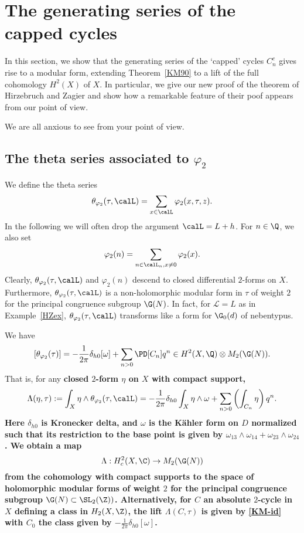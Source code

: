 \section{The generating series of the capped cycles}

In this section, we show that the generating series of the `capped'
cycles $C_n^c$ gives rise to a modular form, extending Theorem~\ref{KM90}
to a lift of the full cohomology $H^2(X)$ of $X$. In particular,
we give our new proof of the theorem of Hirzebruch and Zagier and
show how a remarkable feature of their poof appears from our point
of view.

We are all anxious to see from your point of view.


\subsection{The theta series associated to $\varphi_2$}

We define the theta series
\[
\theta_{\varphi_2}(\tau,\calL) = \sum_{x \in \calL} \varphi_2(x,\tau,z).
\]
 In the following we will often drop the argument $\calL = L+h$. For $n \in \Q$, we also set 
\[
\varphi_2(n) = \sum_{n \in \calL_n, x \ne0} \varphi_2(x).
\]
Clearly, $\theta_{\varphi_2}(\tau,\calL)$ and $\varphi_2(n)$ descend
to closed differential $2$-forms on $X$. Furthermore,
$\theta_{\varphi_2}(\tau,\calL)$ is a non-holomorphic modular form
in $\tau$ of weight $2$ for the principal congruence subgroup
$\G(N)$. In fact, for $\mathcal{L} = L$ as in Example~\ref{HZex},
$\theta_{\varphi_2}(\tau,\calL)$ transforms like a form for $\G_0(d)$
of nebentypus.

\begin{theorem}\label{KM90}
We have
\[
[\theta_{\varphi_2}(\tau)] =  -\frac{1}{2\pi}\delta_{h0} [\omega] + \sum_{n>0} \PD[C_n] q^n \in H^2(X,\Q) \otimes M_2(\G(N)).
\]
That is, for any \bf{closed} $2$-form $\eta$ on $X$ with compact support,
\[
\Lambda(\eta,\tau) := \int_X \eta \wedge \theta_{\varphi_2}(\tau,\calL)= -\frac{1}{2\pi}\delta_{h0} \int_X \eta \wedge \omega + \sum_{n>0} \left( \int_{C_n} \eta \right)q^n.
\]
Here $\delta_{h0}$ is Kronecker delta, and $\omega$ is the K{\"a}hler
form on $D$ normalized such that its restriction to the base point
is given by $\omega_{13}\wedge \omega_{14}+\omega_{23}\wedge
\omega_{24}$.
We obtain a map
\begin{equation}
\Lambda: H_c^{2}(X,\C) \to M_{2}(\G(N))
\end{equation}
from the cohomology with compact supports to the space of holomorphic
modular forms of weight $2$ for the principal congruence subgroup
$\G(N) \subset \SL_2(\Z))$. Alternatively, for $C$ an absolute
$2$-cycle in $X$ defining a class in $H_2(X,\Z)$, the lift
$\Lambda(C,\tau)$ is given by \eqref{KM-id} with $C_0$ the class
given by $-\frac{1}{2\pi}\delta_{h0} [\omega]$.
\end{theorem}


